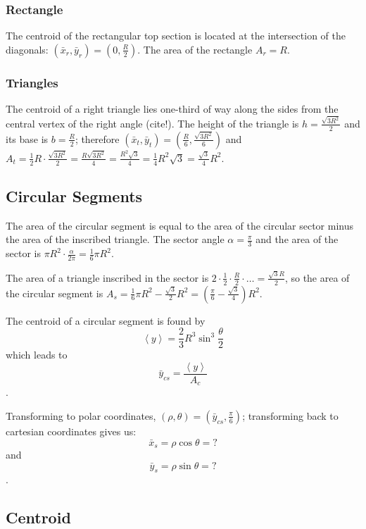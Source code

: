 \documentclass{article}
\begin{document}
\subsubsection{Rectangle}

The centroid of the rectangular top section is located at the intersection of
the diagonals: $(\bar{x}_r,\bar{y}_r) = (0,\frac{R}{2})$.  The area of the
rectangle $A_r = R$.

\subsubsection{Triangles}

The centroid of a right triangle lies one-third of way along the sides
from the central vertex of the right angle (cite!).  The height
of the triangle is $h = \frac{\sqrt{3R^2}}{2}$ and its base is $b = \frac{R}{2}$;
therefore $(\bar{x}_t,\bar{y}_t) = (\frac{R}{6},\frac{\sqrt{3R^2}}{6})$
and
  $A_t = \frac{1}{2}R\cdot\frac{\sqrt{3R^2}}{2}
       = \frac{R\sqrt{3R^2}}{4}
		 = \frac{R^2\sqrt{3}}{4}
		 = \frac{1}{4}R^2\sqrt{3}
		 = \frac{\sqrt{3}}{4}R^2$.

\subsection{Circular Segments}

The area of the circular segment is equal to the area of the circular sector
minus the area of the inscribed triangle.  The sector angle $\alpha = \frac{\pi}{3}$
and the area of the sector is $\pi R^2 \cdot \frac{\alpha}{2\pi} = \frac{1}{6}\pi R^2$.

The area of a triangle inscribed in the sector is $2 \cdot \frac{1}{2} \cdot \frac{R}{2} \cdot \ldots
  = \frac{\sqrt{3}R}{2}$, so the area of the circular segment is
$A_s = \frac{1}{6}\pi R^2 - \frac{\sqrt{3}}{2}R^2 = (\frac{\pi}{6} - \frac{\sqrt{3}}{4})R^2$.

The centroid of a circular segment is found by
$$\left<y\right> = \frac{2}{3}R^3 \sin^3 \frac{\theta}{2}$$
which leads to $$\bar{y}_{cs} = \frac{\left<y\right>}{A_c}$$.

Transforming to polar coordinates, $(\rho,\theta) = (\bar{y}_{cs},\frac{\pi}{6})$;
transforming back to cartesian coordinates gives us:
$$\bar{x}_s = \rho\cos\theta = ?$$ and $$\bar{y}_s = \rho\sin\theta = ?$$.

\subsection{Centroid}
\end{document}
